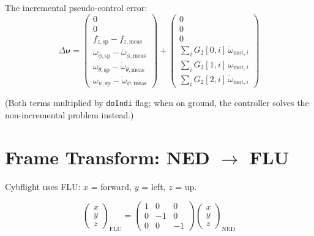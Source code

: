 \documentclass[11pt]{article}
\newcommand{\ned}{\mathrm{NED}}
\newcommand{\flu}{\mathrm{FLU}}
\begin{document}
The incremental pseudo-control error:
\begin{equation}\label{eq:dv_ned}
    \Delta\bm{\nu} = \begin{pmatrix}
        0 \\ 0 \\
        f_{z,\mathrm{sp}} - f_{z,\mathrm{meas}} \\
        \dot{\omega}_{\phi,\mathrm{sp}} - \dot{\omega}_{\phi,\mathrm{meas}} \\
        \dot{\omega}_{\theta,\mathrm{sp}} - \dot{\omega}_{\theta,\mathrm{meas}} \\
        \dot{\omega}_{\psi,\mathrm{sp}} - \dot{\omega}_{\psi,\mathrm{meas}}
    \end{pmatrix}
    + \begin{pmatrix} 0 \\ 0 \\ 0 \\
        \sum_i G_2[0,i] \, \dot{\omega}_{\mathrm{mot},i} \\
        \sum_i G_2[1,i] \, \dot{\omega}_{\mathrm{mot},i} \\
        \sum_i G_2[2,i] \, \dot{\omega}_{\mathrm{mot},i}
    \end{pmatrix}
\end{equation}

(Both terms multiplied by \texttt{doIndi} flag; when on ground, the controller
solves the non-incremental problem instead.)

\section{Frame Transform: NED $\to$ FLU}

Cybflight uses FLU: $x$ = forward, $y$ = left, $z$ = up.

\begin{equation}
    \begin{pmatrix} x \\ y \\ z \end{pmatrix}_{\!\flu}
    = \begin{pmatrix} 1 & 0 & 0 \\ 0 & -1 & 0 \\ 0 & 0 & -1 \end{pmatrix}
    \begin{pmatrix} x \\ y \\ z \end{pmatrix}_{\!\ned}
\end{equation}
\end{document}
